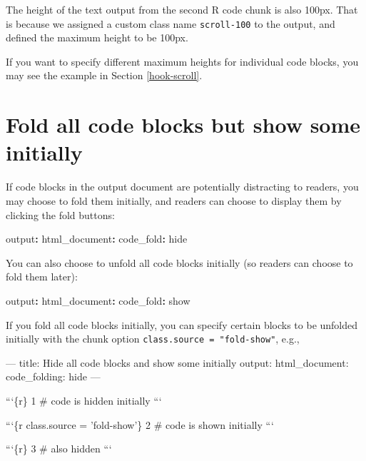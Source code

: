 \documentclass[
  11pt,
]{krantz}
\newenvironment{Shaded}{\begin{snugshade}}{\end{snugshade}}
\newcommand{\AttributeTok}[1]{\textcolor[rgb]{0.61,0.61,0.61}{#1}}
\newcommand{\BaseNTok}[1]{\textcolor[rgb]{0.06,0.06,0.06}{#1}}
\newcommand{\FunctionTok}[1]{\textcolor[rgb]{0,0,0}{#1}}
\newcommand{\KeywordTok}[1]{\textcolor[rgb]{0.27,0.27,0.27}{\textbf{#1}}}
\newcommand{\NormalTok}[1]{#1}
\begin{document}
The height of the text output from the second R code chunk is also 100px. That is because we assigned a custom class name \texttt{scroll-100} to the output, and defined the maximum height to be 100px.

If you want to specify different maximum heights for individual code blocks, you may see the example in Section \ref{hook-scroll}.

\hypertarget{fold-show}{%
\section{Fold all code blocks but show some initially}\label{fold-show}}

If code blocks in the output document are potentially distracting to readers, you may choose to fold them initially, and readers can choose to display them by clicking the fold buttons:

\begin{Shaded}
\begin{Highlighting}[]
\FunctionTok{output}\KeywordTok{:}
\AttributeTok{  }\FunctionTok{html_document}\KeywordTok{:}
\AttributeTok{    }\FunctionTok{code_fold}\KeywordTok{:}\AttributeTok{ hide}
\end{Highlighting}
\end{Shaded}

You can also choose to unfold all code blocks initially (so readers can choose to fold them later):

\begin{Shaded}
\begin{Highlighting}[]
\FunctionTok{output}\KeywordTok{:}
\AttributeTok{  }\FunctionTok{html_document}\KeywordTok{:}
\AttributeTok{    }\FunctionTok{code_fold}\KeywordTok{:}\AttributeTok{ show}
\end{Highlighting}
\end{Shaded}

If you fold all code blocks initially, you can specify certain blocks to be unfolded initially with the chunk option \texttt{class.source\ =\ "fold-show"}, e.g.,

\begin{Shaded}
\begin{Highlighting}[]
\NormalTok{---}
\NormalTok{title: Hide all code blocks and show some initially}
\NormalTok{output:}
\NormalTok{  html_document:}
\BaseNTok{    code_folding: hide}
\NormalTok{---}

\BaseNTok{```\{r\}}
\BaseNTok{1  # code is hidden initially}
\BaseNTok{```}

\BaseNTok{```\{r class.source = 'fold-show'\}}
\BaseNTok{2  # code is shown initially}
\BaseNTok{```}

\BaseNTok{```\{r\}}
\BaseNTok{3  # also hidden}
\BaseNTok{```}
\end{Highlighting}
\end{Shaded}
\end{document}

